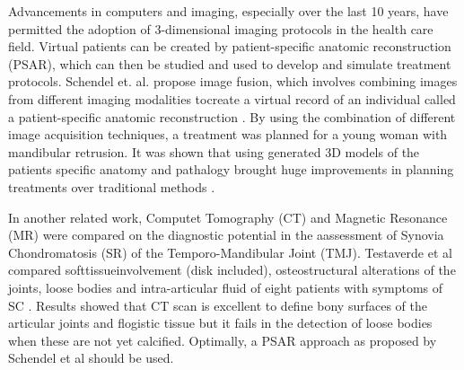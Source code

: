 Advancements in computers and imaging, especially over the last 10 years, have permitted the adoption of 3-dimensional imaging protocols in the health care field.
\newline
Virtual patients can be created by patient-specific anatomic reconstruction (PSAR), which can then be studied and used to develop and simulate treatment protocols.
Schendel et. al. propose image fusion, which involves combining images from different imaging modalities tocreate a virtual record of an individual called a patient-specific anatomic reconstruction \cite{schendel2009three}.
By using the combination of different image acquisition techniques, a treatment was planned for a young woman with mandibular retrusion.
It was shown that using generated 3D models of the patients specific anatomy and pathalogy brought huge improvements in planning treatments over traditional methods \cite{schendel2009three}.

In another related work, Computet Tomography (CT) and Magnetic Resonance (MR) were compared on the diagnostic potential in the aassessment of Synovia Chondromatosis (SR) of the Temporo-Mandibular Joint (TMJ).
Testaverde et al compared softtissueinvolvement (disk included), osteostructural alterations of the joints, loose bodies and intra-articular fluid of eight patients with symptoms of SC \cite{testaverde2011ct}.         
Results showed that CT scan is excellent to define bony surfaces of the articular joints and flogistic tissue but it fails in the detection of loose bodies when these are not yet calcified.
Optimally, a PSAR approach as proposed by Schendel et al \cite{schendel2009three} should be used.